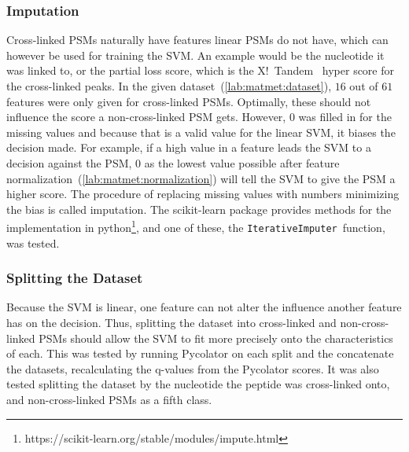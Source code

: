 \subsubsection{Imputation}
\label{lab:matmet:imputation}
Cross-linked PSMs naturally have features linear PSMs do not have, which can however be used for training the SVM. An example would be the nucleotide it was linked to, or the partial loss score, which is the X!~Tandem~\cite{Craig2004} hyper score for the cross-linked peaks. In the given dataset~(\ref{lab:matmet:dataset}), $16$ out of $61$ features were only given for cross-linked PSMs. Optimally, these should not influence the score a non-cross-linked PSM gets. However, $0$ was filled in for the missing values and because that is a valid value for the linear SVM, it biases the decision made. For example, if a high value in a feature leads the SVM to a decision against the PSM, $0$ as the lowest value possible after feature normalization~(\ref{lab:matmet:normalization}) will tell the SVM to give the PSM a higher score. The procedure of replacing missing values with numbers minimizing the bias is called imputation. The scikit-learn package provides methods for the implementation in python\footnote{https://scikit-learn.org/stable/modules/impute.html}, and one of these, the \texttt{IterativeImputer}~function, was tested.
\subsubsection{Splitting the Dataset}
\label{lab:matmet:splitting}
Because the SVM is linear, one feature can not alter the influence another feature has on the decision. Thus, splitting the dataset into cross-linked and non-cross-linked PSMs should allow the SVM to fit more precisely onto the characteristics of each. This was tested by running Pycolator on each split and the concatenate the datasets, recalculating the q-values from the Pycolator scores. It was also tested splitting the dataset by the nucleotide the peptide was cross-linked onto, and non-cross-linked PSMs as a fifth class.
